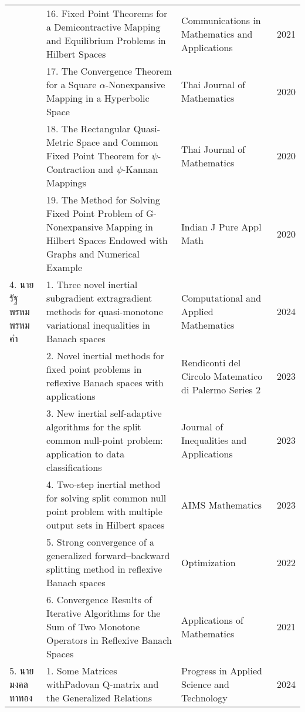 {{\begin{center}
\begin{longtable}{|p{}|>{\raggedright}p{}|>{\raggedright}p{}|p{}|}
&16. Fixed Point Theorems 
for a Demicontractive
Mapping and Equilibrium 
Problems in Hilbert Spaces 
&Communications 
in Mathematics
and Applications
&2021 \\	\cline{2-4}

&17. The Convergence
Theorem for a Square 
$\alpha$-Nonexpansive
Mapping in a Hyperbolic Space
&Thai Journal of Mathematics
&2020 \\ \cline{2-4}


&18. The Rectangular
Quasi-Metric Space 
and Common
Fixed Point Theorem
for $\psi$-Contraction
and $\psi$-Kannan
Mappings
&Thai Journal 
of Mathematics
&2020 \\ \cline{2-4}

&19. The Method for 
Solving Fixed Point
Problem of G-Nonexpansive
Mapping in Hilbert 
Spaces Endowed 
with Graphs and 
Numerical Example
&Indian J Pure
Appl Math &
2020 \\ \hline


4. นายรัฐพรหม พรหมคำ
&1. Three novel inertial subgradient extragradient methods for quasi-monotone variational inequalities in Banach spaces
&Computational and \newline Applied Mathematics
&2024 \\ \cline{2-4}

&2. Novel inertial methods for fixed point problems in reflexive Banach spaces with applications
&Rendiconti del Circolo Matematico di Palermo Series 2
&2023 \\ \cline{2-4}

&3. New inertial self-adaptive algorithms for the split common null-point problem: application to data classifications
&Journal of Inequalities and Applications
&2023 \\ \cline{2-4}

&4. Two-step inertial method
for solving split common 
null point problem with 
multiple output sets in Hilbert spaces
&AIMS Mathematics
&2023 \\ \cline{2-4}

&5. Strong convergence of a
generalized forward–backward
splitting method in 
reflexive Banach spaces
&Optimization
&2022 \\ \cline{2-4}

&6. Convergence Results of Iterative Algorithms for the Sum of Two Monotone Operators in Reflexive Banach Spaces
&Applications  of Mathematics
&2021 \\ \hline

5. นายมงคล ทาทอง
&1. Some Matrices with\newline Padovan Q-matrix and the Generalized Relations
&Progress in Applied Science and Technology
&2024 \\ \cline{2-4}


\end{longtable}
\end{center}}}
